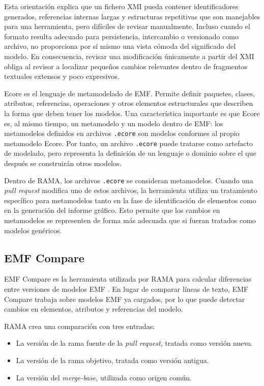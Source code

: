 \documentclass[11pt]{article}
\begin{document}
Esta orientación explica que un fichero XMI pueda contener identificadores generados, referencias internas largas y estructuras repetitivas que son manejables para una herramienta, pero difíciles de revisar manualmente. Incluso cuando el formato resulta adecuado para persistencia, intercambio o versionado como archivo, no proporciona por sí mismo una vista cómoda del significado del modelo. En consecuencia, revisar una modificación únicamente a partir del XMI obliga al revisor a localizar pequeños cambios relevantes dentro de fragmentos textuales extensos y poco expresivos.

Ecore es el lenguaje de metamodelado de EMF. Permite definir paquetes, clases, atributos, referencias, operaciones y otros elementos estructurales que describen la forma que deben tener los modelos. Una característica importante es que Ecore es, al mismo tiempo, un metamodelo y un modelo dentro de EMF: los metamodelos definidos en archivos \texttt{.ecore} son modelos conformes al propio metamodelo Ecore. Por tanto, un archivo \texttt{.ecore} puede tratarse como artefacto de modelado, pero representa la definición de un lenguaje o dominio sobre el que después se construirán otros modelos.

Dentro de RAMA, los archivos \texttt{.ecore} se consideran metamodelos. Cuando una \textit{pull request} modifica uno de estos archivos, la herramienta utiliza un tratamiento específico para metamodelos tanto en la fase de identificación de elementos como en la generación del informe gráfico. Esto permite que los cambios en metamodelos se representen de forma más adecuada que si fueran tratados como modelos genéricos.

\subsection{EMF Compare}

EMF Compare es la herramienta utilizada por RAMA para calcular diferencias entre versiones de modelos EMF \cite{emfcompare-overview,emfcompare-api}. En lugar de comparar líneas de texto, EMF Compare trabaja sobre modelos EMF ya cargados, por lo que puede detectar cambios en elementos, atributos y referencias del modelo.

RAMA crea una comparación con tres entradas:

\begin{itemize}
    \item La versión de la rama fuente de la \textit{pull request}, tratada como versión nueva.
    \item La versión de la rama objetivo, tratada como versión antigua.
    \item La versión del \textit{merge-base}, utilizada como origen común.
\end{itemize}
\end{document}
